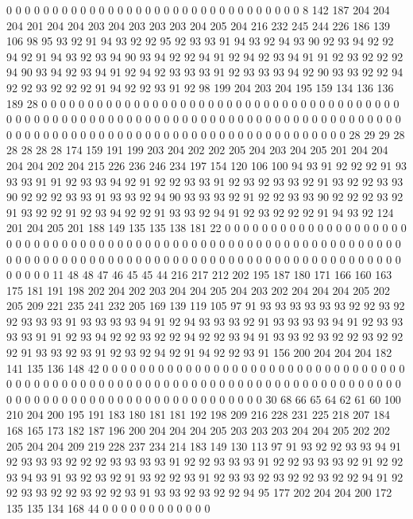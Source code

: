 0 0 0 0 0 0 0 0 0 0 0 0 0 0 0 0 0 0 0 0
0 0 0 0 0 0 0 0 0 0 0 0 8 142 187 204 204 204 201 204
204 203 204 203 203 203 204 205 204 216 232 245 244 226 186 139 106 98 95 93
92 91 94 93 92 92 95 92 93 93 91 94 93 92 94 93 90 92 93 94
92 92 94 92 91 94 93 92 93 94 90 93 94 92 92 94 91 92 94 92
93 94 91 91 92 93 92 92 92 94 90 93 94 92 93 94 91 92 94 92
93 93 93 91 92 93 93 93 94 92 90 93 93 92 92 94 92 92 93 92
92 92 91 94 92 92 93 91 92 98 199 204 203 204 195 159 134 136 136 189
28 0 0 0 0 0 0 0 0 0 0 0 0 0 0 0 0 0 0 0
0 0 0 0 0 0 0 0 0 0 0 0 0 0 0 0 0 0 0 0
0 0 0 0 0 0 0 0 0 0 0 0 0 0 0 0 0 0 0 0
0 0 0 0 0 0 0 0 0 0 0 0 0 0 0 0 0 0 0 0
0 0 0 0 0 0 0 0 0 0 0 0 0 0 0 0 0 0 0 0
0 0 0 0 0 0 0 0 0 0 0 0 0 0 0 0 0 0 0 0
28 29 29 28 28 28 28 28 174 159 191 199 203 204 202 202 205 204 203 204
205 201 204 204 204 204 202 204 215 226 236 246 234 197 154 120 106 100 94 93
91 92 92 92 91 93 93 93 91 91 92 93 93 94 92 91 92 92 93 93
91 92 93 92 93 93 92 91 93 92 92 93 93 90 92 92 92 93 93 91
93 93 92 94 90 93 93 93 92 91 92 92 93 93 90 92 92 92 93 92
91 93 92 92 91 92 93 94 92 92 91 93 93 92 94 91 92 93 92 92
92 91 94 93 92 124 201 204 205 201 188 149 135 135 138 181 22 0 0 0
0 0 0 0 0 0 0 0 0 0 0 0 0 0 0 0 0 0 0 0
0 0 0 0 0 0 0 0 0 0 0 0 0 0 0 0 0 0 0 0
0 0 0 0 0 0 0 0 0 0 0 0 0 0 0 0 0 0 0 0
0 0 0 0 0 0 0 0 0 0 0 0 0 0 0 0 0 0 0 0
0 0 0 0 0 0 0 0 0 0 0 0 0 0 0 0 0 0 0 0
0 0 0 0 0 0 0 0 11 48 48 47 46 45 45 44 216 217 212 202
195 187 180 171 166 160 163 175 181 191 198 202 204 202 203 204 204 205 204 203
202 204 204 204 205 202 205 209 221 235 241 232 205 169 139 119 105 97 91 93
93 93 93 93 93 92 92 93 92 92 93 93 93 91 93 93 93 93 94 91
92 94 93 93 93 92 91 93 93 93 93 94 91 92 93 93 93 93 91 91
92 93 94 92 92 93 92 92 94 92 92 93 94 91 93 93 92 93 92 92
93 92 92 92 91 93 93 92 93 91 92 93 92 94 92 91 94 92 92 93
91 156 200 204 204 204 182 141 135 136 148 42 0 0 0 0 0 0 0 0
0 0 0 0 0 0 0 0 0 0 0 0 0 0 0 0 0 0 0 0
0 0 0 0 0 0 0 0 0 0 0 0 0 0 0 0 0 0 0 0
0 0 0 0 0 0 0 0 0 0 0 0 0 0 0 0 0 0 0 0
0 0 0 0 0 0 0 0 0 0 0 0 0 0 0 0 0 0 0 0
0 0 0 0 0 0 0 0 0 0 0 0 0 0 0 0 30 68 66 65
64 62 61 60 100 210 204 200 195 191 183 180 181 181 192 198 209 216 228 231
225 218 207 184 168 165 173 182 187 196 200 204 204 204 205 203 203 203 204 204
205 202 202 205 204 204 209 219 228 237 234 214 183 149 130 113 97 91 93 92
92 93 93 94 91 92 93 93 93 92 92 92 93 93 93 93 91 92 92 93
93 93 91 92 92 93 93 93 92 91 92 92 93 94 93 91 93 92 93 92
91 93 92 92 93 91 92 93 93 92 93 92 92 93 92 92 94 91 92 92
93 93 92 92 93 92 92 93 91 93 93 92 93 92 92 94 95 177 202 204
204 200 172 135 135 134 168 44 0 0 0 0 0 0 0 0 0 0 0 0
